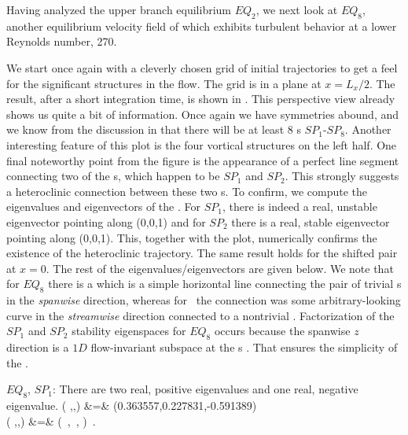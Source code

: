 \documentclass[lineno]{jfm}
\begin{document}
Having analyzed the upper branch equilibrium $EQ_2$, we next look at 
$EQ_8$, another equilibrium velocity field of {\pCf} which exhibits 
turbulent behavior at a lower Reynolds number, 270.


We start once again with a cleverly chosen grid of initial trajectories 
to get a feel for the significant structures in the flow. The grid is in 
a plane at $x = L_{x}/2$. The result, after a short integration time, is 
shown in . This perspective view already shows 
us quite a bit of information. Once again we have symmetries abound, and 
we know from the discussion in  that there will be 
at least 8 {\stagp}s $SP_1$-$SP_8$.  Another interesting feature of this 
plot is the four vortical structures on the left half. One final 
noteworthy point from the figure is the appearance of a perfect line 
segment connecting two of the {\stagp}s, which happen to be $SP_1$ and 
$SP_2$. This strongly suggests a heteroclinic connection between these 
two \stagp s. To confirm, we compute the eigenvalues and eigenvectors of 
the \velgradmat. For $SP_1$, there is indeed a real, unstable eigenvector 
pointing along (0,0,1) and for $SP_2$ there is a real, stable eigenvector 
pointing along (0,0,1). This, together with the plot, numerically 
confirms the existence of the heteroclinic trajectory. The same result  
holds for the shifted pair at $x = 0$. The rest of the 
eigenvalues/eigenvectors are given below. We note that for $EQ_8$ there 
is a {\hc} which is a simple horizontal line connecting the pair of 
trivial \stagp s in the \emph{spanwise} direction, whereas for \tUB\ 
the connection was some arbitrary-looking curve in the 
\emph{streamwise} direction connected to a nontrivial \stagp. 
Factorization of the $SP_1$ and $SP_2$ stability eigenspaces for $EQ_8$ 
occurs because the spanwise $z$ direction is a $1D$ flow-invariant 
subspace at the \stagp s \citep{SiCvi10}. That ensures the simplicity of 
the \hec. 

$EQ_8$, $SP_1$: There are two real, positive eigenvalues
 and one real, negative eigenvalue.
\bea
\left(
    \eigExp[1],\eigExp[2],\eigExp[3]
\right) &=&
      (0.363557,0.227831,-0.591389)
\label{E8SP1} \\
\left(
    \jEigvec[1],\jEigvec[2],\jEigvec[3]
\right) &=&
\left(
    \left[\begin{array}{c}
             {0} \cr
             {0} \cr
             {1}
 \end{array}\right] \,,
    \left[\begin{array}{c}
             {-0.733415} \cr
             {-0.679780} \cr
             {0}
 \end{array}\right] \,,
    \left[\begin{array}{c}
             {0.991005} \cr
             {0.133824} \cr
             {0}
 \end{array}\right]
\right) \,.
\nnu
\eea
\end{document}
